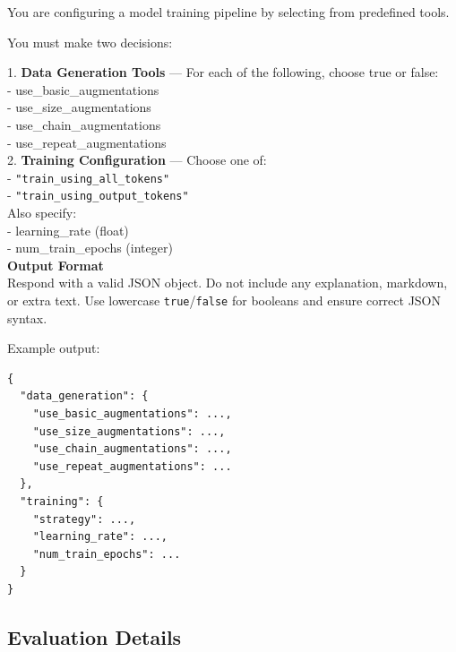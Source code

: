 \documentclass{article}
\begin{document}
\begin{tcolorbox}
You are configuring a model training pipeline by selecting from predefined tools.

You must make two decisions:

1. \textbf{Data Generation Tools} --- For each of the following, choose true or false:\\
\hspace*{1em}- use\_basic\_augmentations\\
\hspace*{1em}- use\_size\_augmentations\\
\hspace*{1em}- use\_chain\_augmentations\\
\hspace*{1em}- use\_repeat\_augmentations\\

2. \textbf{Training Configuration} --- Choose one of:\\
\hspace*{1em}- \texttt{"train\_using\_all\_tokens"}\\
\hspace*{1em}- \texttt{"train\_using\_output\_tokens"}\\

Also specify:\\
\hspace*{1em}- learning\_rate (float)\\
\hspace*{1em}- num\_train\_epochs (integer)\\

\textbf{Output Format}\\

Respond with a valid JSON object. Do not include any explanation, markdown, or extra text. Use lowercase \texttt{true}/\texttt{false} for booleans and ensure correct JSON syntax.

Example output:
\begin{verbatim}
{
  "data_generation": {
    "use_basic_augmentations": ...,
    "use_size_augmentations": ...,
    "use_chain_augmentations": ...,
    "use_repeat_augmentations": ...
  },
  "training": {
    "strategy": ...,
    "learning_rate": ...,
    "num_train_epochs": ...
  }
}
\end{verbatim}
\end{tcolorbox}


\subsection{Evaluation Details}
\end{document}
